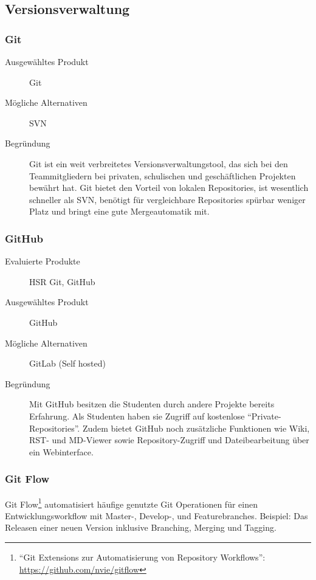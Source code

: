 		\subsection{Versionsverwaltung}
			\subsubsection{Git}
				\begin{description}
					\item[Ausgewähltes Produkt] Git
					\item[Mögliche Alternativen] SVN
					\item[Begründung] Git ist ein weit verbreitetes Versionsverwaltungstool, das sich bei den Teammitgliedern bei privaten, schulischen und geschäftlichen Projekten bewährt hat. Git bietet den Vorteil von lokalen Repositories, ist wesentlich schneller als SVN, benötigt für vergleichbare Repositories spürbar weniger Platz und bringt eine gute Mergeautomatik mit.
				\end{description}

			\subsubsection{GitHub}
				\begin{description}
					\item[Evaluierte Produkte] HSR Git, GitHub
					\item[Ausgewähltes Produkt] GitHub
					\item[Mögliche Alternativen] GitLab (Self hosted)
					\item[Begründung] Mit GitHub besitzen die Studenten durch andere Projekte bereits Erfahrung. 
						Als Studenten haben sie Zugriff auf kostenlose "`Private-Repositories"'. 
						Zudem bietet GitHub noch zusätzliche Funktionen wie Wiki, RST- und MD-Viewer sowie
						Repository-Zugriff und Dateibearbeitung über ein Webinterface.
				\end{description}
				
			\subsubsection{Git Flow}
				Git Flow\footnote{"`Git Extensions zur Automatisierung von Repository Workflows"': \url{https://github.com/nvie/gitflow}} automatisiert häufige genutzte Git Operationen für einen Entwicklungsworkflow \cite{driessen_successful_2010} mit Master-, Develop-, und Featurebranches.
				Beispiel: Das Releasen einer neuen Version inklusive Branching, Merging und Tagging.
				
